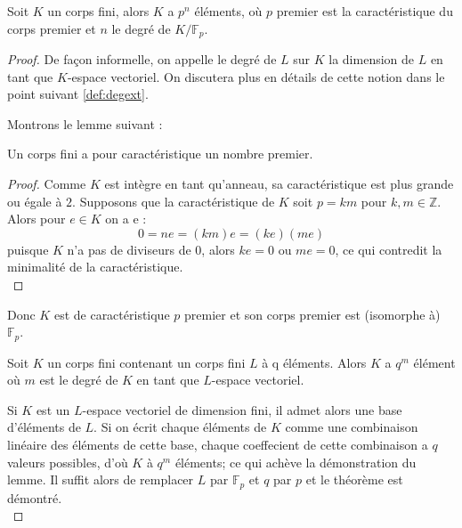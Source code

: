 \documentclass[a4paper]{article} %
\numberwithin{section}{part}
\numberwithin{equation}{section}
\newcommand\GF[1]{\mathbb{F}_{#1}}
\newcommand\ZZ{\mathbb{Z}}
\begin{document}
\begin{thm}
\label{th:corfincarprem}
Soit $K$ un corps fini, alors $K$ a $p^n$ éléments, où $p$ premier est la
caractéristique du corps premier et $n$ le degré de $K/\GF{p}$.
\end{thm}
\begin{proof}
De façon informelle, on appelle le degré de $L$ sur $K$ la dimension de $L$
en tant que $K$-espace vectoriel. On discutera plus en détails de cette
notion dans le point suivant \ref{def:degext}.\par
Montrons le lemme suivant :
\begin{lem}
Un corps fini a pour caractéristique un nombre premier.
\end{lem}
\begin{proof}
Comme $K$ est intègre en tant qu'anneau, sa caractéristique est plus grande ou
égale à $2$. Supposons que la caractéristique de $K$ soit $p = km$ pour $k,
m\in\ZZ$. Alors pour $e\in K$ on a e :
\[0 = ne = (km)e = (ke)(me)\]
puisque $K$ n'a pas de diviseurs de $0$, alors $ke = 0$ ou $me = 0$, ce
qui contredit la minimalité de la caractéristique.\\
\end{proof}
Donc $K$ est de caractéristique $p$ premier et son corps premier est (isomorphe
à) $\GF{p}$.
\begin{lem}
Soit $K$ un corps fini contenant un corps fini $L$ à q éléments. Alors $K$ a
$q^m$ élément où $m$ est le degré de $K$ en tant que $L$-espace vectoriel.
\end{lem}
Si $K$ est un $L$-espace vectoriel de dimension fini, il admet alors une base
d'éléments de $L$. Si on écrit chaque éléments de $K$ comme une combinaison
linéaire des éléments de cette base, chaque coeffecient de cette combinaison a
$q$ valeurs possibles, d'où $K$ à $q^m$ éléments; ce qui achève la démonstration
du lemme. Il suffit alors de remplacer $L$ par $\GF{p}$ et $q$ par $p$ et le
théorème est démontré.\\
\end{proof}
\end{document}
